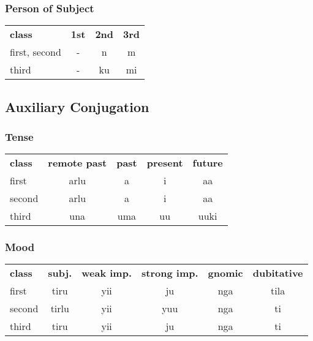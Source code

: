 \documentclass{article}
\begin{document}
\begin{multicols*}{3}
\subsubsection{Person of Subject}
\begin{tabular}{lccc}
\textbf{class} & \textbf{1st} & \textbf{2nd} & \textbf{3rd} \\
first, second & -           & n          & m    \\
third & -           & ku          & mi    \\
\end{tabular}

\subsection{Auxiliary Conjugation}

\subsubsection{Tense}
\begin{tabular}{lcccc}
\textbf{class} & \textbf{remote past} & \textbf{past} & \textbf{present} & \textbf{future}\\
first & arlu & a & i & aa \\
second & arlu & a & i & aa\\
third & una & uma & uu & uuki\\
\end{tabular}

\subsubsection{Mood}
\begin{tabular}{lccccc}
\textbf{class} & \textbf{subj.} & \textbf{weak imp.} & \textbf{strong imp.} & \textbf{gnomic} & \textbf{dubitative}\\
first &  tiru & yii & ju & nga & tila\\
second & tirlu & yii & yuu & nga & ti\\
third &  tiru & yii &  ju & nga & ti\\
\end{tabular}


\end{multicols*}
\end{document}

